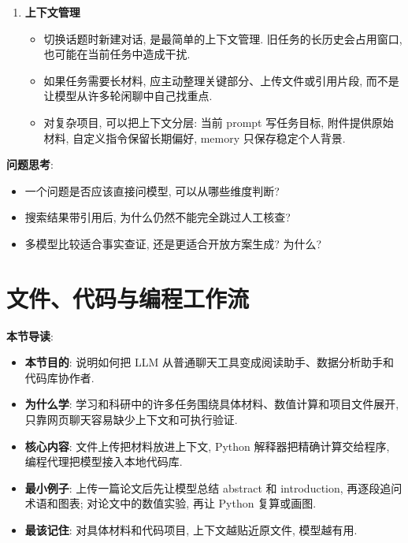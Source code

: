 \documentclass{../nndlcourse}
\begin{document}
\begin{enumerate}
\begin{itemize}
      \item 对开放性问题, 可以把多个模型当作“委员会”. 旅行建议、写作风格、方案比较、产品构思等任务, 多模型回答能暴露不同角度. 但事实问题仍要回到来源核查.
    \end{itemize}
  \item \textbf{上下文管理}
    \begin{itemize}
      \item 切换话题时新建对话, 是最简单的上下文管理. 旧任务的长历史会占用窗口, 也可能在当前任务中造成干扰.
      \item 如果任务需要长材料, 应主动整理关键部分、上传文件或引用片段, 而不是让模型从许多轮闲聊中自己找重点.
      \item 对复杂项目, 可以把上下文分层: 当前 prompt 写任务目标, 附件提供原始材料, 自定义指令保留长期偏好, memory 只保存稳定个人背景.
    \end{itemize}
\end{enumerate}

\textbf{问题思考}:
\begin{itemize}
  \item 一个问题是否应该直接问模型, 可以从哪些维度判断?
  \item 搜索结果带引用后, 为什么仍然不能完全跳过人工核查?
  \item 多模型比较适合事实查证, 还是更适合开放方案生成? 为什么?
\end{itemize}

\section{文件、代码与编程工作流}

\textbf{本节导读}:
\begin{itemize}
  \item \textbf{本节目的}: 说明如何把 LLM 从普通聊天工具变成阅读助手、数据分析助手和代码库协作者.
  \item \textbf{为什么学}: 学习和科研中的许多任务围绕具体材料、数值计算和项目文件展开, 只靠网页聊天容易缺少上下文和可执行验证.
  \item \textbf{核心内容}: 文件上传把材料放进上下文, Python 解释器把精确计算交给程序, 编程代理把模型接入本地代码库.
  \item \textbf{最小例子}: 上传一篇论文后先让模型总结 abstract 和 introduction, 再逐段追问术语和图表; 对论文中的数值实验, 再让 Python 复算或画图.
  \item \textbf{最该记住}: 对具体材料和代码项目, 上下文越贴近原文件, 模型越有用.
\end{itemize}
\end{document}
